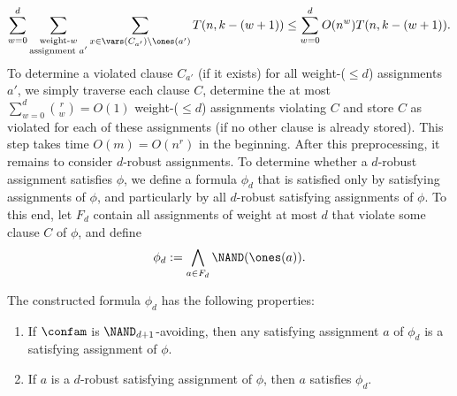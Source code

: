 \begin{equation}\label{eq:rec1}
\sum_{w=0}^d \sum_{\substack{\text{weight-}w\\ \text{assignment }a'}} \sum_{x\in \vars(C_{a'})\setminus \ones(a')} T(n, k-(w+1)) \le \sum_{w=0}^d O(n^w) T(n, k-(w+1)). 
\end{equation}
To determine a violated clause $C_{a'}$ (if it exists) for all weight-($\le d$) assignments $a'$, we simply traverse each clause $C$, determine the at most $\sum_{w=0}^d {r \choose w}= O(1)$ weight-($\le d$) assignments violating $C$ and store $C$ as violated for each of these assignments (if no other clause is already stored). This step takes time $O(m) = O(n^r)$ in the beginning. 
%
%
After this preprocessing, it remains to consider $d$-robust assignments. To determine whether a $d$-robust assignment satisfies $\phi$, we define a formula $\phi_d$ that is satisfied only by satisfying assignments of $\phi$, and particularly by all $d$-robust satisfying assignments of $\phi$. To this end, let $F_d$ contain all assignments of weight at most $d$ that violate some clause $C$ of $\phi$, and define
\[ \phi_d := \bigwedge_{a \in F_d} \NAND(\ones(a)). \]
  \begin{lem}\label{lem:NANDrep}
  The constructed formula $\phi_d$ has the following properties:
\begin{enumerate}[label=(P\arabic*)]
  \item If $\confam$ is $\NAND_{d+1}$-avoiding, then any satisfying assignment $a$ of $\phi_d$ is a satisfying assignment of $\phi$.
  \item If $a$ is a $d$-robust satisfying assignment of $\phi$, then $a$ satisfies $\phi_d$.
    \end{enumerate}
  \end{lem}
